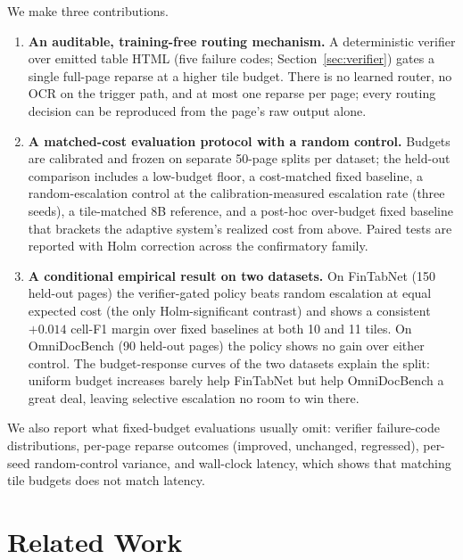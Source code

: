 \documentclass[conference]{IEEEtran}
\begin{document}
We make three contributions.
\begin{enumerate}
  \item \textbf{An auditable, training-free routing mechanism.} A
  deterministic verifier over emitted table HTML (five failure codes;
  Section~\ref{sec:verifier}) gates a single full-page reparse at a higher
  tile budget. There is no learned router, no OCR on the trigger path,
  and at most one reparse per page; every routing decision can be
  reproduced from the page's raw output alone.
  \item \textbf{A matched-cost evaluation protocol with a random
  control.} Budgets are calibrated and frozen on separate 50-page splits
  per dataset; the held-out comparison includes a low-budget floor, a
  cost-matched fixed baseline, a random-escalation control at the
  calibration-measured escalation rate (three seeds), a tile-matched 8B
  reference, and a post-hoc over-budget fixed baseline that brackets the
  adaptive system's realized cost from above. Paired tests are reported
  with Holm correction across the confirmatory family.
  \item \textbf{A conditional empirical result on two datasets.} On
  FinTabNet (150 held-out pages) the verifier-gated policy beats random
  escalation at equal expected cost (the only Holm-significant contrast)
  and shows a consistent $+0.014$ cell-F1 margin over fixed baselines at
  both 10 and 11 tiles. On OmniDocBench (90 held-out pages) the policy
  shows no gain over either control. The budget-response curves of the
  two datasets explain the split: uniform budget increases barely help
  FinTabNet but help OmniDocBench a great deal, leaving selective
  escalation no room to win there.
\end{enumerate}

We also report what fixed-budget evaluations usually omit: verifier
failure-code distributions, per-page reparse outcomes (improved,
unchanged, regressed), per-seed random-control variance, and wall-clock
latency, which shows that matching tile budgets does not match latency.

\section{Related Work}
\label{sec:related}
\end{document}
